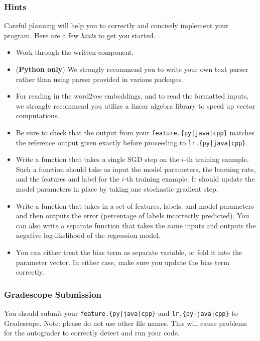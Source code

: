 \documentclass[11pt,addpoints,answers]{exam}
\begin{document}
\subsubsection{Hints}
Careful planning will help you to correctly and concisely implement your program. Here are a few \emph{hints} to get you started.
\begin{itemize}
    \item Work through the written component.
    \item (\textbf{Python only}) We strongly recommend you to write your own text parser rather than using parser provided in various packages.
    \item For reading in the word2vec embeddings, and to read the formatted inputs, we strongly recommend you utilize a linear algebra library to speed up vector computations.
    \item Be sure to check that the output from your \texttt{feature.\{py|java|cpp\}} matches the reference output given exactly before proceeding to \texttt{lr.\{py|java|cpp\}}.
    \item Write a function that takes a single SGD step on the $i$-th training example. Such a function should take as input the model parameters, the learning rate, and the features and label for the $i$-th training example. It should update the model parameters in place by taking one stochastic gradient step.
    \item Write a function that takes in a set of features, labels, and model parameters and then outputs the error (percentage of labels incorrectly predicted). You can also write a separate function that takes the same inputs and outputs the negative log-likelihood of the regression model.
    \item You can either treat the bias term as separate variable, or fold it into the parameter vector. In either case, make sure you update the bias term correctly.  
\end{itemize}

\subsubsection{Gradescope Submission}

You should submit your \texttt{feature.\{py|java|cpp\}} and %
\texttt{lr.\{py|java|cpp\}} to Gradescope.
Note: please do not use other file names. This will cause problems for the autograder to correctly detect and run your code.
\end{document}
